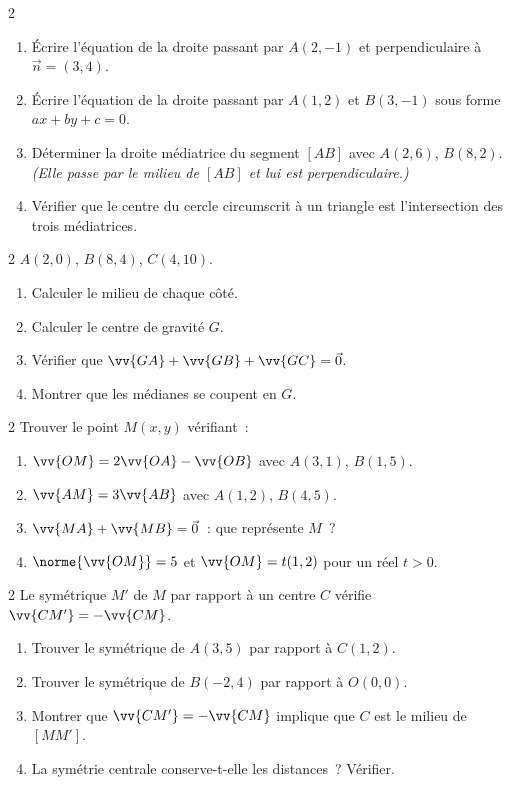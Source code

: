\begin{exo}{2}
\begin{enumerate}
  \item \'Ecrire l'\'equation de la droite passant par $A(2,-1)$ et
        perpendiculaire \`a $\vec{n}=(3,4)$.
  \item \'Ecrire l'\'equation de la droite passant par $A(1,2)$ et
        $B(3,-1)$ sous forme $ax+by+c=0$.
  \item D\'eterminer la droite m\'ediatrice du segment $[AB]$
        avec $A(2,6)$, $B(8,2)$.
        \emph{(Elle passe par le milieu de $[AB]$ et lui est perpendiculaire.)}
  \item V\'erifier que le centre du cercle circumscrit \`a un triangle
        est l'intersection des trois m\'ediatrices.
\end{enumerate}
\end{exo}

\begin{exo}{2}
$A(2,0)$, $B(8,4)$, $C(4,10)$.
\begin{enumerate}
  \item Calculer le milieu de chaque c\^ot\'e.
  \item Calculer le centre de gravité $G$.
  \item V\'erifier que $\vv{GA}+\vv{GB}+\vv{GC}=\vec{0}$.
  \item Montrer que les m\'edianes se coupent en $G$.
\end{enumerate}
\end{exo}

\begin{exo}{2}
Trouver le point $M(x,y)$ v\'erifiant~:
\begin{enumerate}
  \item $\vv{OM} = 2\vv{OA} - \vv{OB}$ avec $A(3,1)$, $B(1,5)$.
  \item $\vv{AM} = 3\vv{AB}$ avec $A(1,2)$, $B(4,5)$.
  \item $\vv{MA} + \vv{MB} = \vec{0}$~: que repr\'esente $M$~?
  \item $\norme{\vv{OM}} = 5$ et $\vv{OM} = t(1,2)$ pour un r\'eel $t>0$.
\end{enumerate}
\end{exo}

\begin{exo}{2}
Le sym\'etrique $M'$ de $M$ par rapport \`a un centre $C$ v\'erifie
$\vv{CM'} = -\vv{CM}$.
\begin{enumerate}
  \item Trouver le sym\'etrique de $A(3,5)$ par rapport \`a $C(1,2)$.
  \item Trouver le sym\'etrique de $B(-2,4)$ par rapport \`a $O(0,0)$.
  \item Montrer que $\vv{CM'}=-\vv{CM}$ implique que $C$ est le milieu de $[MM']$.
  \item La sym\'etrie centrale conserve-t-elle les distances~? V\'erifier.
\end{enumerate}
\end{exo}

